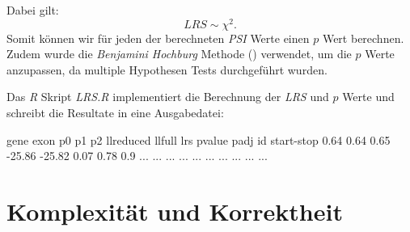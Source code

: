 \documentclass[12pt]{article}
\begin{document}
Dabei gilt: 
\[
    LRS \sim \chi^{2}
.\]
Somit können wir für jeden der berechneten \textit{PSI} Werte einen $p$ Wert berechnen. 
Zudem wurde die \textit{Benjamini Hochburg} Methode (\cite{bh_correction}) verwendet, um die $p$ Werte 
anzupassen, da multiple Hypothesen Tests durchgeführt wurden.

Das \textit{R} Skript \textit{LRS.R} implementiert die Berechnung der \textit{LRS} und $p$
Werte und schreibt die Resultate in eine Ausgabedatei:

\begin{verbatim*}
gene  exon        p0    p1    p2      llreduced    llfull   lrs  pvalue padj
id    start-stop  0.64  0.64  0.65  -25.86       -25.82  0.07 0.78   0.9
...   ...         ...   ...   ...   ...          ...     ...  ...    ...
    
\end{verbatim*}

\section{Komplexität und Korrektheit}\label{sec:Komplexität und Korrektheit}
\end{document}
